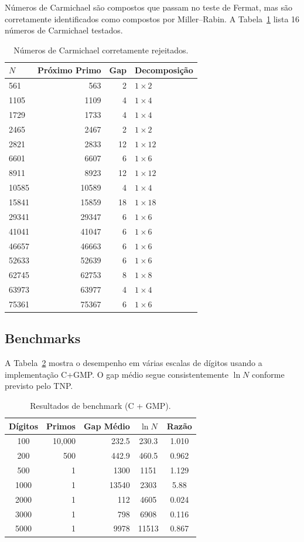 \documentclass[12pt,a4paper]{article}
\theoremstyle{plain}
\begin{document}
Números de Carmichael são compostos que passam no teste de Fermat, mas são
corretamente identificados como compostos por Miller--Rabin.
A Tabela~\ref{tab:carmichael} lista 16 números de Carmichael testados.

\begin{table}[htbp]
\centering
\caption{Números de Carmichael corretamente rejeitados.}
\label{tab:carmichael}
\begin{tabular}{lrrl}
\hline
$N$ & Próximo Primo & Gap & Decomposição \\
\hline
561 & 563 & 2 & $1\times2$ \\
1105 & 1109 & 4 & $1\times4$ \\
1729 & 1733 & 4 & $1\times4$ \\
2465 & 2467 & 2 & $1\times2$ \\
2821 & 2833 & 12 & $1\times12$ \\
6601 & 6607 & 6 & $1\times6$ \\
8911 & 8923 & 12 & $1\times12$ \\
10585 & 10589 & 4 & $1\times4$ \\
15841 & 15859 & 18 & $1\times18$ \\
29341 & 29347 & 6 & $1\times6$ \\
41041 & 41047 & 6 & $1\times6$ \\
46657 & 46663 & 6 & $1\times6$ \\
52633 & 52639 & 6 & $1\times6$ \\
62745 & 62753 & 8 & $1\times8$ \\
63973 & 63977 & 4 & $1\times4$ \\
75361 & 75367 & 6 & $1\times6$ \\
\hline
\end{tabular}
\end{table}

\subsection{Benchmarks}

A Tabela~\ref{tab:bench} mostra o desempenho em várias escalas de dígitos usando a
implementação C+GMP.  O gap médio segue consistentemente
$\ln N$ conforme previsto pelo TNP.

\begin{table}[htbp]
\centering
\caption{Resultados de benchmark (C + GMP).}
\label{tab:bench}
\begin{tabular}{crrcc}
\hline
Dígitos & Primos & Gap Médio & $\ln N$ & Razão \\
\hline
100 & 10,000 & 232.5 & 230.3 & 1.010 \\
200 & 500 & 442.9 & 460.5 & 0.962 \\
500 & 1 & 1300 & 1151 & 1.129 \\
1000 & 1 & 13540 & 2303 & 5.88 \\
2000 & 1 & 112 & 4605 & 0.024 \\
3000 & 1 & 798 & 6908 & 0.116 \\
5000 & 1 & 9978 & 11513 & 0.867 \\
\hline
\end{tabular}
\end{table}
\end{document}
